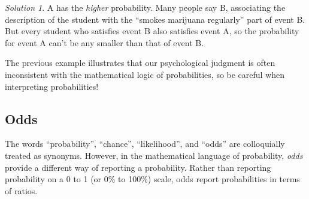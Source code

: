 \documentclass[
  letterpaper,
  DIV=11,
  numbers=noendperiod]{scrreprt}
\theoremstyle{plain}
\theoremstyle{definition}
\theoremstyle{definition}
\theoremstyle{definition}
\theoremstyle{remark}
\newtheorem{refsolution}{Solution}[chapter]
\begin{document}

\begin{tcolorbox}[enhanced jigsaw, opacityback=0, rightrule=.15mm, coltitle=black, colframe=quarto-callout-tip-color-frame, toprule=.15mm, colbacktitle=quarto-callout-tip-color!10!white, opacitybacktitle=0.6, left=2mm, toptitle=1mm, breakable, title={Solution (click to expand)}, bottomtitle=1mm, colback=white, leftrule=.75mm, titlerule=0mm, arc=.35mm, bottomrule=.15mm]

\begin{refsolution}
A has the \emph{higher} probability. Many people say B, associating the
description of the student with the ``smokes marijuana regularly'' part
of event B. But every student who satisfies event B also satisfies event
A, so the probability for event A can't be any smaller than that of
event B.

\label{sol-linda}

\end{refsolution}

\end{tcolorbox}

The previous example illustrates that our psychological judgment is
often inconsistent with the mathematical logic of probabilities, so be
careful when interpreting probabilities!

\subsection{Odds}\label{odds}

The words ``probability'', ``chance'', ``likelihood'', and ``odds'' are
colloquially treated as synonyms. However, in the mathematical language
of probability, \emph{odds} provide a different way of reporting a
probability. Rather than reporting probability on a 0 to 1 (or 0\% to
100\%) scale, odds report probabilities in terms of ratios.
\end{document}

